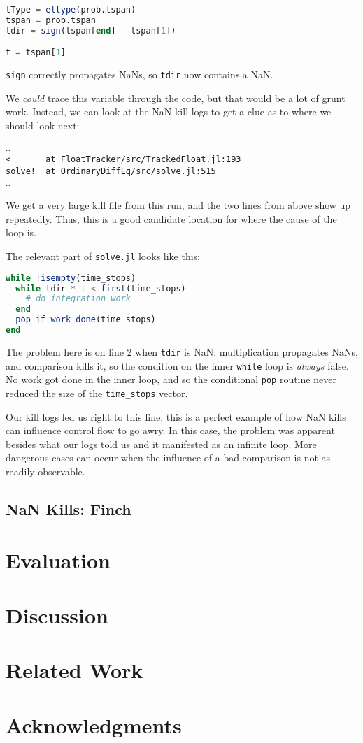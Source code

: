 \documentclass{juliacon}
\begin{document}
\begin{lstlisting}[language = Julia]
tType = eltype(prob.tspan)
tspan = prob.tspan
tdir = sign(tspan[end] - tspan[1])

t = tspan[1]
\end{lstlisting}

\texttt{sign} correctly propagates NaNs, so \texttt{tdir} now contains a NaN.

We \emph{could} trace this variable through the code, but that would be a lot of grunt work.
Instead, we can look at the NaN kill logs to get a clue as to where we should look next:

\begin{verbatim}
…
<       at FloatTracker/src/TrackedFloat.jl:193
solve!  at OrdinaryDiffEq/src/solve.jl:515
…
\end{verbatim}

We get a very large kill file from this run, and the two lines from above show up repeatedly.
Thus, this is a good candidate location for where the cause of the loop is.

The relevant part of \texttt{solve.jl} looks like this:


\begin{lstlisting}[language = Julia]
while !isempty(time_stops)
  while tdir * t < first(time_stops)
    # do integration work
  end
  pop_if_work_done(time_stops)
end
\end{lstlisting}

The problem here is on line 2 when \texttt{tdir} is NaN: multiplication propagates NaNs, and comparison kills it, so the condition on the inner \texttt{while} loop is \emph{always} false.
No work got done in the inner loop, and so the conditional \texttt{pop} routine never reduced the size of the \texttt{time\_stops} vector.

Our kill logs led us right to this line; this is a perfect example of how NaN kills can influence control flow to go awry.
In this case, the problem was apparent besides what our logs told us and it manifested as an infinite loop.
More dangerous cases can occur when the influence of a bad comparison is not as readily observable.

\subsection{NaN Kills: Finch}


\section{Evaluation}

\section{Discussion}

\section{Related Work}

\section{Acknowledgments}


\end{document}
